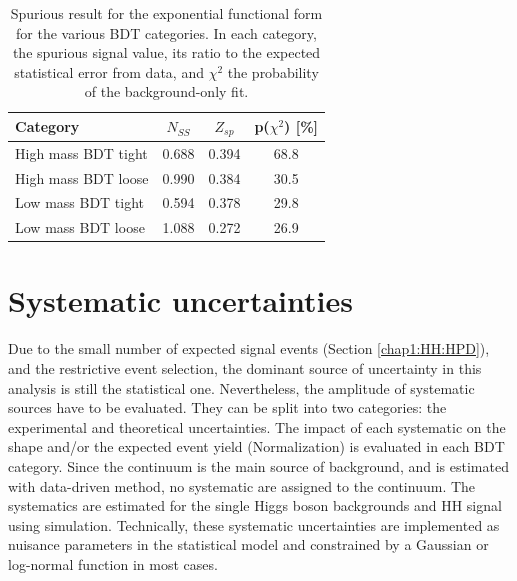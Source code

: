 \begin{table}[]
    \centering
    \begin{tabular}{lccc}
    \hline\hline
       Category  & $N_{SS}$ & $Z_{sp}$ & p($\chi^2$) [\%] \\
       \hline
       High mass BDT tight &  0.688 & 0.394 & 68.8 \\
       High mass BDT loose &  0.990 & 0.384 & 30.5 \\
       Low mass BDT tight  &  0.594 & 0.378 & 29.8 \\
       Low mass BDT loose  & 1.088  & 0.272 & 26.9 \\
       \hline\hline
    \end{tabular}
    \caption{Spurious result for the exponential functional form for the various BDT categories. In each category, the spurious signal value, its ratio to the expected statistical error from data, and $\chi^2$ the probability of the background-only fit.}
    \label{tab:HHyybb:Modelling:Bkg:SS}
\end{table}

\section{Systematic uncertainties}
\label{HHyybb:Syst}
Due to the small number of expected signal events (Section \ref{chap1:HH:HPD}), and the restrictive event selection, the dominant source of uncertainty in this analysis is still the statistical one. Nevertheless, the amplitude of systematic sources have to be evaluated. They can be split into two categories: the experimental and theoretical uncertainties. The impact of each systematic on the shape and/or the expected event yield (Normalization) is evaluated in each BDT category. Since the continuum is the main source of background, and is estimated with data-driven method, no systematic are assigned to the continuum. The systematics are estimated for the single Higgs boson backgrounds and HH signal using simulation. Technically, these systematic uncertainties are implemented as nuisance parameters in the statistical model and constrained by a Gaussian or log-normal function in most cases. 
